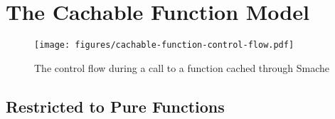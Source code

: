 

\section{The Cachable Function Model}
\label{sec:the_cachable_function_model}


\begin{figure*}[ht!]
  \centering
  \texttt{[image: figures/cachable-function-control-flow.pdf]}
  \caption{The control flow during a call to a function cached through Smache}
  \label{fig:cachable-function-control-flow}
\end{figure*}




\subsection{Restricted to Pure Functions}
\label{subsec:restricted_to_pure_functions}

